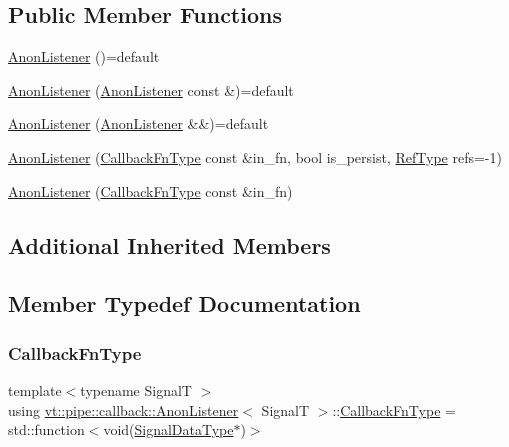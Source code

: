 \subsection*{Public Member Functions}
\begin{DoxyCompactItemize}
\item 
\hyperlink{structvt_1_1pipe_1_1callback_1_1_anon_listener_ad9ac07733e0f6500aa340c606370eef7}{Anon\+Listener} ()=default
\item 
\hyperlink{structvt_1_1pipe_1_1callback_1_1_anon_listener_aa118ce8196dc5ae4bcce9c076c13fe96}{Anon\+Listener} (\hyperlink{structvt_1_1pipe_1_1callback_1_1_anon_listener}{Anon\+Listener} const \&)=default
\item 
\hyperlink{structvt_1_1pipe_1_1callback_1_1_anon_listener_aa6d501a31dc807d01a6b71bc2011e90d}{Anon\+Listener} (\hyperlink{structvt_1_1pipe_1_1callback_1_1_anon_listener}{Anon\+Listener} \&\&)=default
\item 
\hyperlink{structvt_1_1pipe_1_1callback_1_1_anon_listener_afaa19c0b06e657dc701b60ebc9427b0d}{Anon\+Listener} (\hyperlink{structvt_1_1pipe_1_1callback_1_1_anon_listener_ad5d8a2cc6a1599642855e92bbd10f89c}{Callback\+Fn\+Type} const \&in\+\_\+fn, bool is\+\_\+persist, \hyperlink{namespacevt_a9b39ce9494bb04674d0d5b895a5aa50f}{Ref\+Type} refs=-\/1)
\item 
\hyperlink{structvt_1_1pipe_1_1callback_1_1_anon_listener_ad7eef759667c0dcff5506ab45e28eda4}{Anon\+Listener} (\hyperlink{structvt_1_1pipe_1_1callback_1_1_anon_listener_ad5d8a2cc6a1599642855e92bbd10f89c}{Callback\+Fn\+Type} const \&in\+\_\+fn)
\end{DoxyCompactItemize}
\subsection*{Additional Inherited Members}


\subsection{Member Typedef Documentation}
\mbox{\label{structvt_1_1pipe_1_1callback_1_1_anon_listener_ad5d8a2cc6a1599642855e92bbd10f89c}} 
\subsubsection{\texorpdfstring{Callback\+Fn\+Type}{CallbackFnType}}
{\footnotesize\ttfamily template$<$typename SignalT $>$ \\
using \hyperlink{structvt_1_1pipe_1_1callback_1_1_anon_listener}{vt\+::pipe\+::callback\+::\+Anon\+Listener}$<$ SignalT $>$\+::\hyperlink{structvt_1_1pipe_1_1callback_1_1_anon_listener_ad5d8a2cc6a1599642855e92bbd10f89c}{Callback\+Fn\+Type} =  std\+::function$<$void(\hyperlink{structvt_1_1pipe_1_1callback_1_1_anon_listener_a26182294e0b15bb16dd94040bb47ed73}{Signal\+Data\+Type}$\ast$)$>$}

